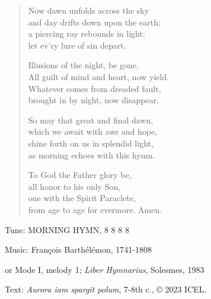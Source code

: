 \hymn

\begin{verse}
Now dawn unfolds across the sky\\
and day drifts down upon the earth;\\
a piercing ray rebounds in light:\\
let ev’ry lure of sin depart.

Illusions of the night, be gone.\\
All guilt of mind and heart, now yield.\\
Whatever comes from dreaded fault,\\
brought in by night, now disappear.

So may that great and final dawn,\\
which we await with awe and hope,\\
shine forth on us in splendid light,\\
as morning echoes with this hymn.

To God the Father glory be,\\
all honor to his only Son,\\
one with the Spirit Paraclete,\\
from age to age for evermore. Amen.
\end{verse}

\begin{hymnsource}
Tune: MORNING HYMN, 8 8 8 8

Music: François Barthélémon, 1741-1808

or Mode I, melody 1; \emph{Liber Hymnarius}, Solesmes, 1983

Text: \emph{Aurora iam spargit polum}, 7-8th c., © 2023 ICEL.
\end{hymnsource}